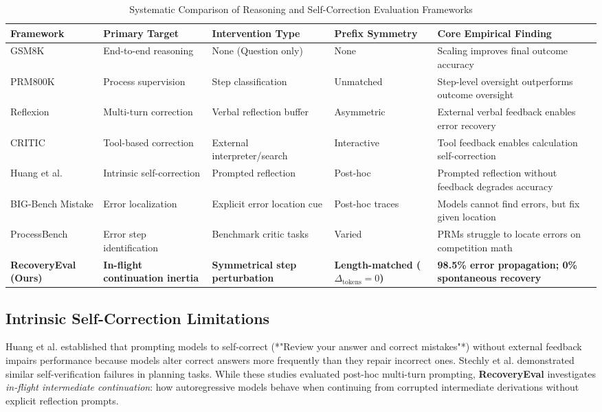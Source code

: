 \documentclass[10pt,conference]{IEEEtran}
\begin{document}
\begin{table}[t]
\caption{Systematic Comparison of Reasoning and Self-Correction Evaluation Frameworks}
\label{tab:literature}
\centering
\begin{tabular}{p{3.2cm}p{3.0cm}p{2.6cm}p{2.8cm}p{4.2cm}}
\toprule
\textbf{Framework} & \textbf{Primary Target} & \textbf{Intervention Type} & \textbf{Prefix Symmetry} & \textbf{Core Empirical Finding} \\
\midrule
GSM8K \cite{cobbe2021gsm8k} & End-to-end reasoning & None (Question only) & None & Scaling improves final outcome accuracy \\
PRM800K \cite{lightman2023process} & Process supervision & Step classification & Unmatched & Step-level oversight outperforms outcome oversight \\
Reflexion \cite{shinn2023reflexion} & Multi-turn correction & Verbal reflection buffer & Asymmetric & External verbal feedback enables error recovery \\
CRITIC \cite{gou2024critic} & Tool-based correction & External interpreter/search & Interactive & Tool feedback enables calculation self-correction \\
Huang et al. \cite{huang2023large} & Intrinsic self-correction & Prompted reflection & Post-hoc & Prompted reflection without feedback degrades accuracy \\
BIG-Bench Mistake \cite{tyen2024bigbenchmistake} & Error localization & Explicit error location cue & Post-hoc traces & Models cannot find errors, but fix given location \\
ProcessBench \cite{zheng2024processbench} & Error step identification & Benchmark critic tasks & Varied & PRMs struggle to locate errors on competition math \\
\midrule
\textbf{RecoveryEval (Ours)} & \textbf{In-flight continuation inertia} & \textbf{Symmetrical step perturbation} & \textbf{Length-matched ($\Delta_{\text{tokens}}=0$)} & \textbf{98.5\% error propagation; 0\% spontaneous recovery} \\
\bottomrule
\end{tabular}
\end{table}

\subsection{Intrinsic Self-Correction Limitations}
Huang et al. \cite{huang2023large} established that prompting models to self-correct (*"Review your answer and correct mistakes"*) without external feedback impairs performance because models alter correct answers more frequently than they repair incorrect ones. Stechly et al. \cite{stechly2024selfverification} demonstrated similar self-verification failures in planning tasks. While these studies evaluated post-hoc multi-turn prompting, \textbf{RecoveryEval} investigates \textit{in-flight intermediate continuation}: how autoregressive models behave when continuing from corrupted intermediate derivations without explicit reflection prompts.
\end{document}
